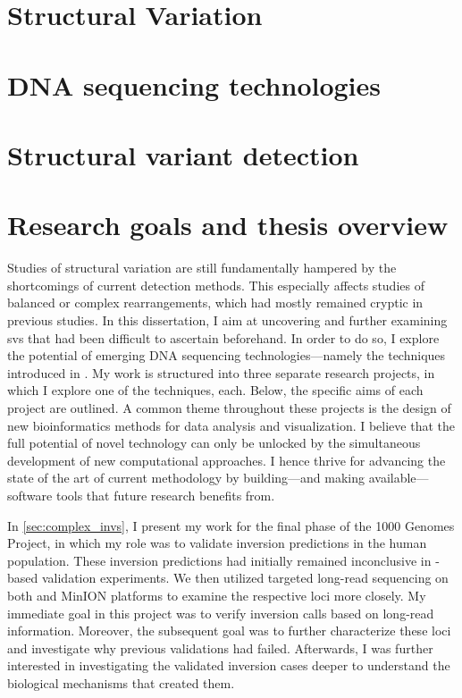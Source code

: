 \section{Structural Variation}
\label{sec:sv}



\section{DNA sequencing technologies}
\label{sec:sequencing}



\section{Structural variant detection}
\label{sec:sv_detection}



\section{Research goals and thesis overview}
\label{sec:motivation}

Studies of structural variation are still fundamentally hampered by the
shortcomings of current \sv detection methods. This especially affects studies
of balanced or complex rearrangements, which had mostly remained cryptic in
previous studies. In this dissertation, I aim at uncovering and further examining
\acp{sv} that had been difficult to ascertain beforehand. In order to do so, I
explore the potential of emerging DNA sequencing technologies---namely the
techniques introduced in .
My work is structured into three separate research projects, in which I explore
one of the techniques, each. Below, the specific aims of each project are
outlined. A common theme throughout these projects is the design of new
bioinformatics methods for data analysis and visualization. I believe that the
full potential of novel technology can only be unlocked by the simultaneous
development of new computational approaches. I hence thrive for advancing the
state of the art of current methodology by building---and making
available---software tools that future research benefits from.

In \cref{sec:complex_invs}, I present my work for the final phase of the
1000 Genomes Project, in which my role was to validate inversion predictions in
the human population. These inversion predictions had initially remained
inconclusive in \pcr-based validation experiments. We then utilized targeted
long-read sequencing on both \pacbio and \ont MinION platforms to examine the
respective loci more closely. My immediate goal in this project was to verify
inversion calls based on long-read information. Moreover, the subsequent goal
was to further characterize these loci and investigate why previous validations
had failed. Afterwards, I was further interested in investigating the validated
inversion cases deeper to understand the biological mechanisms that created
them.

